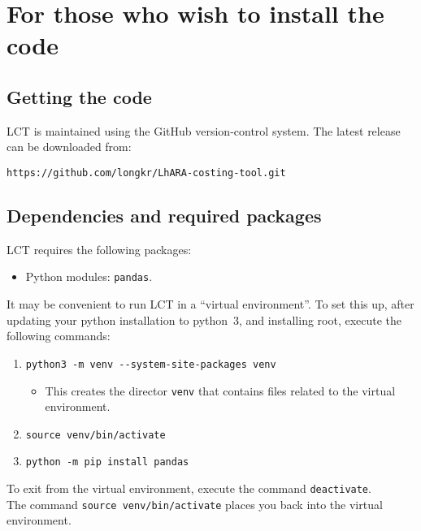 \vskip 0.5cm
\noindent{\color{DarkYellow} \rule[0mm]{\textwidth}{0.43pt}}

\section*{\color{RedViolet} For those who wish to install the code}

\subsection*{\color{DarkGreen} Getting the code}
LCT is maintained using the GitHub version-control system.
The latest release can be downloaded from:
\begin{center}
  {\tt https://github.com/longkr/LhARA-costing-tool.git}
\end{center}

\subsection*{\color{DarkGreen} Dependencies and required packages}
LCT requires the following packages:
\begin{itemize}
  \item Python modules: \verb+pandas+.
\end{itemize}
It may be convenient to run LCT in a ``virtual environment''.
To set this up, after updating your python installation to python~3,
and installing root, execute the following commands:
\begin{enumerate}
  \item \verb+python3 -m venv --system-site-packages venv+
    \begin{itemize}
      \item This creates the director \verb+venv+ that contains files
        related to the virtual environment.
    \end{itemize}
  \item \verb+source venv/bin/activate+
  \item \verb+python -m pip install pandas+
\end{enumerate}
To exit from the virtual environment, execute the command
\verb+deactivate+. \\
\noindent
The command \verb+source venv/bin/activate+ places you back
into the virtual environment.

